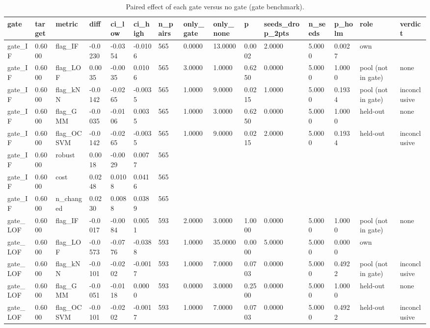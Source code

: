 \begin{table}[t]
\centering
\caption{Paired effect of each gate versus no gate (gate benchmark).}
\label{tab:gate_benchmark_paired_effects}
\small
\begin{tabular}{lllllllllllllll}
\toprule
gate & target & metric & diff & ci\_low & ci\_high & n\_pairs & only\_gate & only\_none & p & seeds\_drop\_2pts & n\_seeds & p\_holm & role & verdict \\
\midrule
gate\_IF & 0.6000 & flag\_IF & -0.0230 & -0.0354 & -0.0106 & 565 & 0.0000 & 13.0000 & 0.0002 & 2.0000 & 5.0000 & 0.0027 & own &  \\
gate\_IF & 0.6000 & flag\_LOF & 0.0035 & -0.0035 & 0.0106 & 565 & 3.0000 & 1.0000 & 0.6250 & 0.0000 & 5.0000 & 1.0000 & pool (not in gate) & none \\
gate\_IF & 0.6000 & flag\_kNN & -0.0142 & -0.0265 & -0.0035 & 565 & 1.0000 & 9.0000 & 0.0215 & 1.0000 & 5.0000 & 0.1934 & pool (not in gate) & inconclusive \\
gate\_IF & 0.6000 & flag\_GMM & -0.0035 & -0.0106 & 0.0035 & 565 & 1.0000 & 3.0000 & 0.6250 & 0.0000 & 5.0000 & 1.0000 & held-out & none \\
gate\_IF & 0.6000 & flag\_OCSVM & -0.0142 & -0.0265 & -0.0035 & 565 & 1.0000 & 9.0000 & 0.0215 & 2.0000 & 5.0000 & 0.1934 & held-out & inconclusive \\
gate\_IF & 0.6000 & robust & 0.0018 & -0.0029 & 0.0077 & 565 &  &  &  &  &  &  &  &  \\
gate\_IF & 0.6000 & cost & 0.0248 & 0.0108 & 0.0416 & 565 &  &  &  &  &  &  &  &  \\
gate\_IF & 0.6000 & n\_changed & 0.0230 & 0.0088 & 0.0389 & 565 &  &  &  &  &  &  &  &  \\
gate\_LOF & 0.6000 & flag\_IF & -0.0017 & -0.0084 & 0.0051 & 593 & 2.0000 & 3.0000 & 1.0000 & 0.0000 & 5.0000 & 1.0000 & pool (not in gate) & none \\
gate\_LOF & 0.6000 & flag\_LOF & -0.0573 & -0.0776 & -0.0388 & 593 & 1.0000 & 35.0000 & 0.0000 & 5.0000 & 5.0000 & 0.0000 & own &  \\
gate\_LOF & 0.6000 & flag\_kNN & -0.0101 & -0.0202 & -0.0017 & 593 & 1.0000 & 7.0000 & 0.0703 & 0.0000 & 5.0000 & 0.4922 & pool (not in gate) & inconclusive \\
gate\_LOF & 0.6000 & flag\_GMM & -0.0051 & -0.0118 & 0.0000 & 593 & 0.0000 & 3.0000 & 0.2500 & 0.0000 & 5.0000 & 1.0000 & held-out & none \\
gate\_LOF & 0.6000 & flag\_OCSVM & -0.0101 & -0.0202 & -0.0017 & 593 & 1.0000 & 7.0000 & 0.0703 & 0.0000 & 5.0000 & 0.4922 & held-out & inconclusive \\

\end{tabular}
\end{table}
